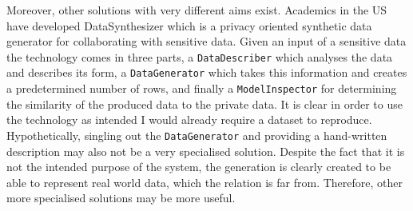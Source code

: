 Moreover, other solutions with very different aims exist. Academics in the US
have developed DataSynthesizer \cite{DataSynthesizer} which is a privacy
oriented synthetic data generator for collaborating with sensitive data. Given
an input of a sensitive data the technology comes in three parts, a
\lstinline{DataDescriber} which analyses the data and describes its form, a
\lstinline{DataGenerator} which takes this information and creates a
predetermined number of rows, and finally a \lstinline{ModelInspector} for
determining the similarity of the produced data to the private data. It is clear
in order to use the technology as intended I would already require a dataset to
reproduce. Hypothetically, singling out the \lstinline{DataGenerator} and
providing a hand-written description may also not be a very specialised
solution. Despite the fact that it is not the intended purpose of the system,
the generation is clearly created to be able to represent real world data, which
the  relation is far from. Therefore, other more specialised
solutions may be more useful.
